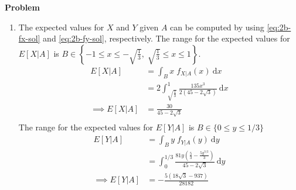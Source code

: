 \documentclass[12pt]{article}
\newenvironment{Ex}{\textbf{Problem}\vspace{.75em}\\}{}
\newcommand{\dd}[1]{\:\mathrm{d}{#1}}
\begin{document}
\begin{enumerate}
\begin{Ex}
\begin{solution}
\begin{enumerate}
\begin{equation}
\begin{aligned}
            \end{aligned} \right.
        \end{equation}
        Or alternatively
        \begin{equation}
          \label{eq:2b-fx-sol}
          \implies f_{X|A}(x) = \left\{
            \begin{aligned}
              & \frac{135 x^2}{2 \left(45-2 \sqrt{3}\right)} &&\quad
              x\in A \\
              & 0 && \quad\text{otherwise} \\
            \end{aligned} \right.
        \end{equation}
      \item The expected values for $X$ and $Y$ given $A$ can be
        computed by using \cref{eq:2b-fx-sol} and \cref{eq:2b-fy-sol},
        respectively. The range for the expected values for $E[X|A]$ is
        $B\in \left\{-1\le x\le-\sqrt{\frac{1}{3}},\;
          \sqrt{\frac{1}{3}}\le x\le1\right\}$.
        \begin{equation}
          \label{eq:2c-expected-x}
          \begin{aligned}
            E[X|A] &= \int_B x\;f_{X|A}(x) \dd{x} \\
            &= 2 \int_{\sqrt{\frac{1}{3}}}^{1} \frac{135 x^3}{2 \left(45-2 \sqrt{3}\right)} \dd{x} \\
            \implies E[X|A] &= \frac{30}{45-2 \sqrt{3}} \\
          \end{aligned}
        \end{equation}
        The range for the expected values for $E[Y|A]$ is $B \in \{0 \le
        y \le 1/3\}$
        \begin{equation}
          \label{eq:2c-expected-y}
          \begin{aligned}
            E[Y|A] &= \int_B y\;f_{Y|A}(y) \dd{y} \\
            &= \int_0^{1/3} \frac{81 y \left(\frac{5}{3}-\frac{5
                  y^{3/2}}{3}\right)}{45-2 \sqrt{3}} \dd{y} \\
            \implies E[Y|A] &= -\frac{5 \left(18
                \sqrt{3}-937\right)}{28182} \\
          \end{aligned}
        \end{equation}
      \end{enumerate}
    \end{solution}

\end{Ex}
\end{enumerate}
\end{document}
